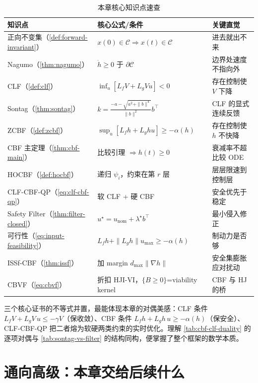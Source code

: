 \begin{table}[H]\centering\small
\caption{本章核心知识点速查}
\label{tab:cbf-summary}
\begin{tabular}{lll}
\toprule
知识点 & 核心公式/条件 & 关键直觉 \\
\midrule
正向不变集（\cref{def:forward-invariant}） & $x(0)\in\mathcal C\Rightarrow x(t)\in\mathcal C$ & 进去就出不来 \\
Nagumo（\cref{thm:nagumo}） & $\dot h\ge0$ 于 $\partial\mathcal C$ & 边界处速度不指向外 \\
CLF（\cref{def:clf}） & $\inf_u[L_fV+L_gVu]<0$ & 存在控制使 $V$ 下降 \\
Sontag（\cref{thm:sontag}） & $k=\frac{-a-\sqrt{a^2+\|b\|^4}}{\|b\|^2}b^\top$ & CLF 的显式连续反馈 \\
ZCBF（\cref{def:zcbf}） & $\sup_u[L_fh+L_ghu]\ge-\alpha(h)$ & 存在控制使 $h$ 不快降 \\
CBF 主定理（\cref{thm:cbf-main}） & 比较引理 $\Rightarrow h(t)\ge0$ & 衰减率不超比较 ODE \\
HOCBF（\cref{def:hocbf}） & 递归 $\psi_i$，约束在第 $r$ 层 & 层层限速到控制层 \\
CLF-CBF-QP（\cref{eq:clf-cbf-qp}） & 软 CLF + 硬 CBF & 安全优先于稳定 \\
Safety Filter（\cref{thm:filter-closed}） & $u^\star=u_{\mathrm{nom}}+\lambda^\star b^\top$ & 最小侵入修正 \\
可行性（\cref{eq:input-feasibility}） & $L_fh+\|L_gh\|u_{\max}\ge-\alpha(h)$ & 制动力是否够 \\
ISSf-CBF（\cref{thm:issf}） & 加 margin $d_{\max}\|\nabla h\|$ & 安全集膨胀应对扰动 \\
CBVF（\cref{eq:cbvf}） & 折扣 HJI-VI，$\{B\ge0\}$=viability kernel & CBF 与 HJ 的桥 \\
\bottomrule
\end{tabular}
\end{table}

三个核心证书的不等式并置，最能体现本章的对偶美感：CLF 条件 $L_fV+L_gV\,u\le-\gamma V$（保收敛）、CBF 条件 $L_fh+L_gh\,u\ge-\alpha(h)$（保安全）、CLF-CBF-QP 把二者熔为软硬两类约束的实时优化。理解 \cref{tab:cbf-clf-duality} 的逐项对偶与 \cref{tab:sontag-vs-filter} 的结构同构，便掌握了整个框架的数学本质。

\section*{通向高级：本章交给后续什么}

